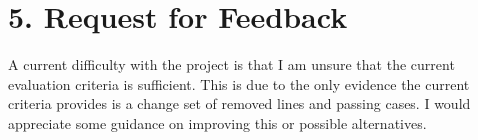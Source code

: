\documentclass[11pt, a4paper, twoside, openright]{report}
\begin{document}
\section*{5. Request for Feedback}


A current difficulty with the project is that I am unsure that the current
evaluation criteria is sufficient.
This is due to the only evidence the current criteria provides is a change set
of removed lines and passing cases. I would appreciate some guidance on
improving this or possible alternatives.



\backmatter{}

%



\appendix
% 
\end{document}
